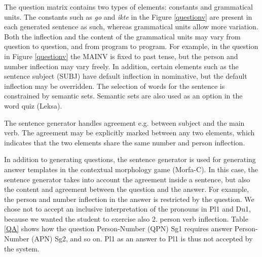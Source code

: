 \documentclass[11pt]{article}
\begin{document}
The question matrix contains two types of elements: constants and grammatical units. The constants such as \textit{go} and \textit{ikte} in the Figure \ref{questionv} are present in each generated sentence as such, whereas grammatical units allow more variation. Both the inflection and the content of the grammatical units may vary from question to question, and from program to program. For example, in the question in Figure \ref{questionv} the MAINV is fixed to past tense, but the person and number inflection may vary freely. In addition, certain elements such as the sentence subject (SUBJ) have default inflection in nominative, but the default inflection may be overridden. The selection of words for the sentence is constrained by semantic sets. Semantic sets are also used as an option in the word quiz (Leksa).
%

The sentence generator handles agreement e.g. between subject and the main verb. The agreement may be explicitly marked between any two elements, which indicates that the two elements share the same number and person inflection.

In addition to generating questions, the sentence generator is used for generating answer templates in the contextual morphology game (Morfa-C). In this case, the sentence generator takes into account the agreement inside a sentence, but also the content and agreement between the question and the answer. For example, the person and number inflection in the answer is restricted by the question. We chose not to accept an inclusive interpretation of the pronouns in Pl1 and Du1, because we wanted the student to exercise also 2. person verb inflection. Table \ref{QA} shows how the question Person-Number (QPN) Sg1 requires answer Person-Number (APN) Sg2, and so on. Pl1 as an answer to Pl1 is thus not accepted by the system.\\
\end{document}
